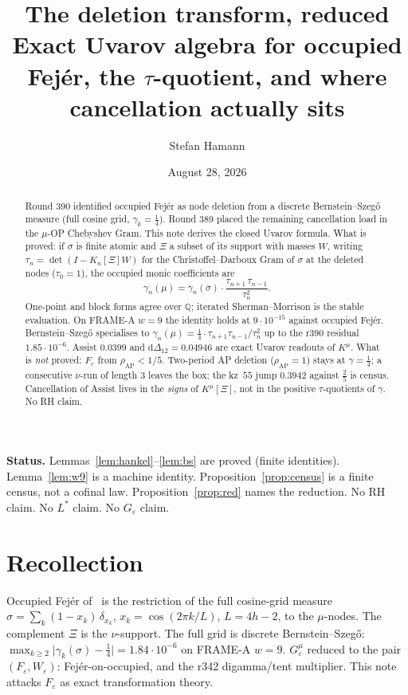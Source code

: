 \documentclass[11pt]{article}
\title{\bfseries The deletion transform, reduced\\[2mm]
\large Exact Uvarov algebra for occupied Fej\'er,
the $\tau$-quotient, and where cancellation actually sits}
\author{Stefan Hamann}
\date{August 28, 2026}
\theoremstyle{remark}
\newcommand{\Q}{\mathbb{Q}}
\newcommand{\eps}{\varepsilon}
\begin{document}
\maketitle

\begin{abstract}\noindent
Round 390 identified occupied Fej\'er as node deletion from a
discrete Bernstein--Szeg\H{o} measure (full cosine grid,
$\gamma_k=\tfrac14$).
Round 389 placed the remaining cancellation load in the $\mu$-OP
Chebyshev Gram.
This note derives the closed Uvarov formula.
What is proved: if $\sigma$ is finite atomic and $\Xi$ a subset of
its support with masses $W$, writing
$\tau_n=\det(I-K_n[\Xi]W)$ for the Christoffel--Darboux Gram of
$\sigma$ at the deleted nodes ($\tau_0=1$), the occupied monic
coefficients are
\[
\gamma_n(\mu)
=
\gamma_n(\sigma)
\cdot
\frac{\tau_{n+1}\,\tau_{n-1}}{\tau_n^2}.
\]
One-point and block forms agree over $\Q$; iterated
Sherman--Morrison is the stable evaluation.
On FRAME-A $w=9$ the identity holds at $9\cdot10^{-15}$ against
occupied Fej\'er.
Bernstein--Szeg\H{o} specialises to
$\gamma_n(\mu)=\tfrac14\cdot\tau_{n+1}\tau_{n-1}/\tau_n^2$
up to the r390 residual $1.85\cdot10^{-6}$.
Assist $0.0399$ and $\mathrm{d}\Delta_{12}=0.04946$ are exact
Uvarov readouts of $K^\mu$.
What is \emph{not} proved: $F_\eps$ from $\rho_{\mathrm{AP}}<1/5$.
Two-period AP deletion ($\rho_{\mathrm{AP}}=1$) stays at
$\gamma=\tfrac14$; a consecutive $\nu$-run of length $3$ leaves
the box; the kz~$55$ jump $0.3942$ against $\tfrac25$ is census.
Cancellation of Assist lives in the \emph{signs} of $K^\mu[\Xi]$,
not in the positive $\tau$-quotients of $\gamma$.
No RH claim.
\end{abstract}

\medskip\noindent
\textbf{Status.}\enspace
Lemmas~\ref{lem:hankel}--\ref{lem:bs} are proved (finite identities).
Lemma~\ref{lem:w9} is a machine identity.
Proposition~\ref{prop:census} is a finite census, not a cofinal law.
Proposition~\ref{prop:red} names the reduction.
No RH claim.  No $L^*$ claim.  No $G_\varepsilon$ claim.

\section{Recollection}\label{sec:rec}

Occupied Fej\'er of~\cite{r390} is the restriction of the full
cosine-grid measure
$\sigma=\sum_k(1-x_k)\,\delta_{x_k}$,
$x_k=\cos(2\pi k/L)$, $L=4h-2$, to the $\mu$-nodes.
The complement $\Xi$ is the $\nu$-support.
The full grid is discrete Bernstein--Szeg\H{o}:
$\max_{k\ge 2}\lvert\gamma_k(\sigma)-\tfrac14\rvert=1.84\cdot10^{-6}$
on FRAME-A $w=9$.
$G_\varepsilon^\mu$ reduced to the pair $(F_\eps,W_\eps)$:
Fej\'er-on-occupied, and the r342 digamma/tent multiplier.
This note attacks $F_\eps$ as exact transformation theory.
\end{document}
